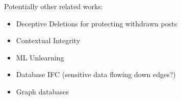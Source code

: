 Potentially other related works:
\begin{itemize}
    \item Deceptive Deletions for protecting withdrawn posts %
    \item Contextual Integrity
    \item ML Unlearning
    \item Database IFC (sensitive data flowing down edges?)
    \item Graph databases
\end{itemize}
\fi
